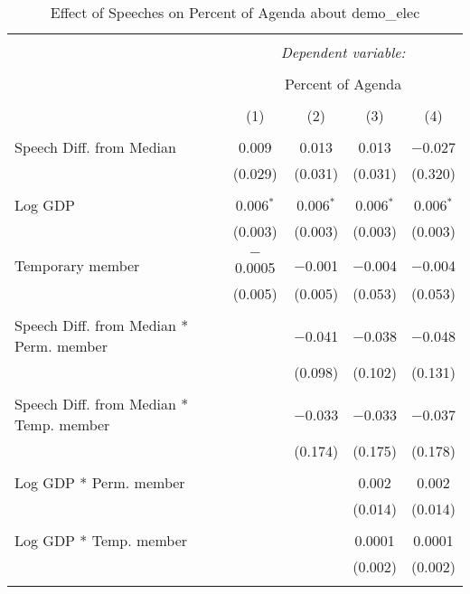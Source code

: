 
\begin{table}[!htbp] \centering 
  \caption{Effect of Speeches on Percent of Agenda about demo_elec} 
  \label{} 
\begin{tabular}{@{\extracolsep{5pt}}lcccc} 
\\[-1.8ex]\hline 
\hline \\[-1.8ex] 
 & \multicolumn{4}{c}{\textit{Dependent variable:}} \\ 
\cline{2-5} 
\\[-1.8ex] & \multicolumn{4}{c}{Percent of Agenda} \\ 
\\[-1.8ex] & (1) & (2) & (3) & (4)\\ 
\hline \\[-1.8ex] 
 Speech Diff. from Median & 0.009 & 0.013 & 0.013 & $-$0.027 \\ 
  & (0.029) & (0.031) & (0.031) & (0.320) \\ 
  & & & & \\ 
 Log GDP & 0.006$^{*}$ & 0.006$^{*}$ & 0.006$^{*}$ & 0.006$^{*}$ \\ 
  & (0.003) & (0.003) & (0.003) & (0.003) \\ 
  & & & & \\ 
 Temporary member & $-$0.0005 & $-$0.001 & $-$0.004 & $-$0.004 \\ 
  & (0.005) & (0.005) & (0.053) & (0.053) \\ 
  & & & & \\ 
 Speech Diff. from Median * Perm. member &  & $-$0.041 & $-$0.038 & $-$0.048 \\ 
  &  & (0.098) & (0.102) & (0.131) \\ 
  & & & & \\ 
 Speech Diff. from Median * Temp. member &  & $-$0.033 & $-$0.033 & $-$0.037 \\ 
  &  & (0.174) & (0.175) & (0.178) \\ 
  & & & & \\ 
 Log GDP * Perm. member &  &  & 0.002 & 0.002 \\ 
  &  &  & (0.014) & (0.014) \\ 
  & & & & \\ 
 Log GDP * Temp. member &  &  & 0.0001 & 0.0001 \\ 
  &  &  & (0.002) & (0.002) \\ 
  & & & & \\ 

\end{tabular}
\end{table}
